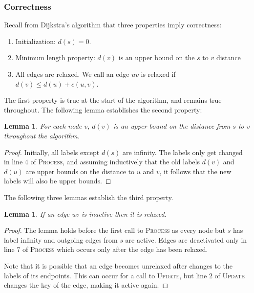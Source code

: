 \documentclass[11pt]{article}
\newtheorem{lemma}[theorem]{Lemma}
\begin{document}
\subsubsection{Correctness}
\label{sec:correctness}

Recall from Dijkstra's algorithm that three properties imply correctness:
\begin{enumerate}
\item Initialization: $d(s) = 0$.
\item Minimum length property: $d(v)$ is an upper bound on the $s$ to $v$ distance
\item All edges are relaxed. We call an edge $uv$ is relaxed if $d(v) \leq d(u) + c(u,v)$.
\end{enumerate}

The first property is true at the start of the algorithm, and remains true throughout. The following lemma establishes the second property:\\

\begin{lemma}
  For each node $v$, $d(v)$ is an upper bound on the distance from $s$ to $v$ throughout the algorithm.
\end{lemma}

\begin{proof}
  Initially, all labels except $d(s)$ are infinity. The labels only get changed in line $4$ of \textsc{Process}, and assuming inductively that the old labels $d(v)$ and $d(u)$ are upper bounds on the distance to $u$ and $v$, it follows that the new labels will also be upper bounds.
\end{proof}

The following three lemmas establish the third property.\\

\begin{lemma}
  If an edge $uv$ is inactive then it is relaxed.
\end{lemma}

\begin{proof}
  The lemma holds before the first call to \textsc{Process} as every node but $s$ has label infinity and outgoing edges from $s$ are active. Edges are deactivated only in line $7$ of \textsc{Process} which occurs only after the edge has been relaxed.

  Note that it is possible that an edge becomes unrelaxed after changes to the labels of its endpoints. This can occur for a call to \textsc{Update}, but line $2$ of \textsc{Update} changes the key of the edge, making it active again.
\end{proof}
\end{document}
